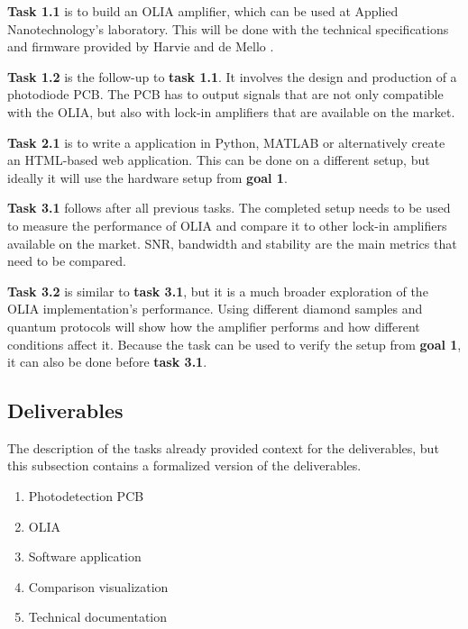 \documentclass{report}
\begin{document}
	\textbf{Task 1.1} is to build an OLIA amplifier, which can be used at Applied Nanotechnology's laboratory. This will be done with the technical specifications and firmware provided by Harvie and de Mello \cite{harvie2023olia}. %
	
	\textbf{Task 1.2} is the follow-up to \textbf{task 1.1}. It involves the design and production of a photodiode PCB. The PCB has to output signals that are not only compatible with the OLIA, but also with lock-in amplifiers that are available on the market. %
	
	\textbf{Task 2.1} is to write a application in Python, MATLAB or alternatively create an HTML-based web application. This can be done on a different setup, but ideally it will use the hardware setup from \textbf{goal 1}. %
	
	
	\textbf{Task 3.1} follows after all previous tasks. The completed setup needs to be used to measure the performance of OLIA and compare it to other lock-in amplifiers available on the market. SNR, bandwidth and stability are the main metrics that need to be compared. %
	
	\textbf{Task 3.2} is similar to \textbf{task 3.1}, but it is a much broader exploration of the OLIA implementation's performance. Using different diamond samples and quantum protocols will show how the amplifier performs and how different conditions affect it. Because the task can be used to verify the setup from \textbf{goal 1}, it can also be done before \textbf{task 3.1}.
	
	
	\subsection{Deliverables}
	The description of the tasks already provided context for the deliverables, but this subsection contains a formalized version of the deliverables.
	
	\begin{enumerate}
		\item Photodetection PCB 
		\item OLIA
		\item Software application
		\item Comparison visualization
		\item Technical documentation
	\end{enumerate}
	
\end{document}

